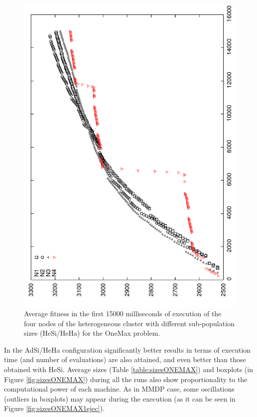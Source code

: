\begin{figure}
\centering
\includegraphics[angle=-90,scale =0.4] {gfx/adaptiveresults/generationsONEMAXheterosize.pdf}
\caption{Average fitness in the first 15000 milliseconds of execution of the four nodes of the heterogeneous cluster with different sub-po\-pu\-la\-tion sizes (HeSi/HeHa) for the OneMax problem.}
\label{fig:gensonemaxheterosize}
\end{figure}


In the AdSi/HeHa configuration significantly better results in terms of execution time (and number of evaluations) are also attained, and even better than those obtained with HeSi. Average sizes (Table \ref{table:sizesONEMAX}) and boxplots (in Figure \ref{fig:sizesONEMAX}) during all the runs also show proportionality to the computational power of each machine. As in MMDP case, some oscillations (outliers in boxplots) may appear during the execution (as it can be seen in Figure \ref{fig:sizesONEMAX1ejec}).

